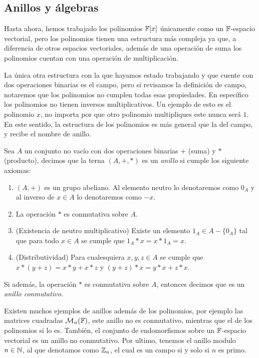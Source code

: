 \subsection{Anillos y álgebras}

Hasta ahora, hemos trabajado los polinomios $\mathbb{F}[x]$ únicamente como un $\mathbb{F}$-espacio vectorial, pero los polinomios tienen una estructura más compleja ya que, a diferencia de otros espacios vectoriales, además de una operación de suma los polinomios cuentan con una operación de multiplicación.

La única otra estructura con la que hayamos estado trabajando y que cuente con dos operaciones binarias es el campo, pero si revisamos la definición de campo, notaremos que los polinomios no cumplen todas esas propiedades. En específico los polinomios no tienen inversos multiplicativos. Un ejemplo de esto es el polinomio $x$, no importa por que otro polinomio multipliques este nunca será $1$. En este sentido, la estructura de los polinomios es más general que la del campo, y recibe el nombre de anillo.

\begin{defi}
  Sea $A$ un conjunto no vacío con dos operaciones binarias $+$ (suma) y $*$ (producto), decimos que la terna $(A,+,*)$ es un \emph{anillo} si cumple los siguiente axiomas:
  \begin{enumerate}
    \item $(A,+)$ es un grupo abeliano. Al elemento neutro lo denotaremos como $0_A$ y al inverso de $x \in A$ lo denotaremos como $-x$.
    \item La operación $*$ es conmutativa sobre $A$.
    \item (Existencia de neutro multiplicativo) Existe un elemento $1_A \in A-\{0_A\}$ tal que para todo $x \in A$ se cumple que $1_A * x = x * 1_A = x$.
    \item (Distributividad) Para cualesquiera $x, y, z \in A$ se cumple que $x * (y + z) = x * y + x * z$ y $(y + z) * x =   y * x + z * x$.
  \end{enumerate}
  Si además, la operación $*$ es conmutativa sobre $A$, entonces decimos que es un \emph{anillo conmutativo}.
\end{defi}

Existen muchos ejemplos de anillos además de los polinomios, por ejemplo las matrices cuadradas $\mathcal{M}_n(\mathbb{F})$, este anillo no es conmutativo, mientras que el de los polinomios si lo es. También, el conjunto de endomorfismos sobre un $\mathbb{F}$-espacio vectorial es un anillo no conmutativo. Por ultimo, tenemos el anillo modulo $n \in \mathbb{N}$, al que denotamos como $\mathbb{Z}_n$, el cual es un campo si y solo si $n$ es primo.


